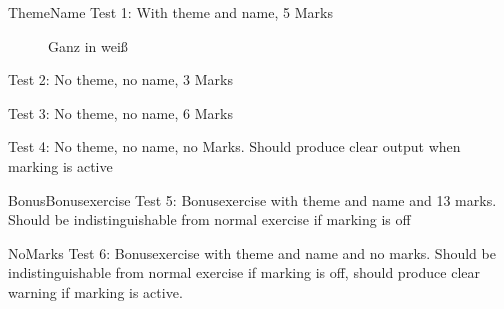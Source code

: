 \documentclass[pdftex,logo,assignment]{newcsen}
\begin{document}
\begin{exercise}{5}{Theme}{Name}
  Test 1: With theme and name, 5 Marks
\end{exercise}

\begin{figure}[ht]
  \centering
  \vspace*{3cm}
  \caption{Ganz in weiß}
  \label{fig:test}
\end{figure}

\begin{exercise}{3}{}{}
  Test 2: No theme, no name, 3 Marks
\end{exercise}

\begin{exercise}{6}{}{}
  Test 3: No theme, no name, 6 Marks
\end{exercise}
 
\begin{exercise}{}{}{}
  Test 4: No theme, no name, no Marks. Should produce clear output
  when marking is active
\end{exercise}

\begin{bonusexercise}{13}{Bonus}{Bonusexercise}
  Test 5: Bonusexercise with theme and name and 13 marks. Should be
  indistinguishable from normal exercise if marking is off
\end{bonusexercise}

\begin{bonusexercise}{}{No}{Marks}
  Test 6: Bonusexercise with theme and name and no marks. Should be
  indistinguishable from normal exercise if marking is off, should
  produce clear warning if marking is active.
\end{bonusexercise}
\end{document}
